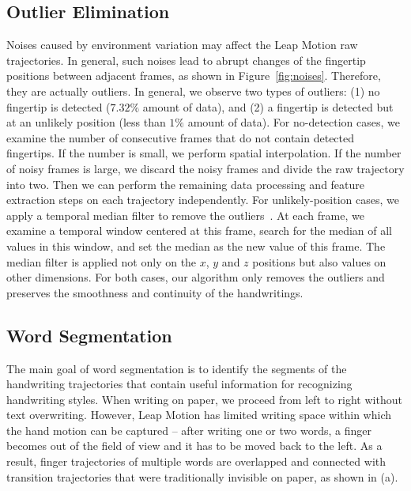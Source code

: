 \subsection{Outlier Elimination}
Noises caused by environment variation may affect the Leap Motion raw trajectories. In general, such noises lead to abrupt changes of the fingertip positions between adjacent frames, as shown in Figure~\ref{fig:noises}. 
Therefore, they are actually outliers. In general, we observe two types of outliers: (1) no fingertip is detected ($7.32\%$ amount of data), and (2) a fingertip is detected but at an unlikely position (less than $1\%$ amount of data). For no-detection cases, we examine the number of consecutive frames that do not contain detected fingertips. If the number is small, we perform spatial interpolation. If the number of noisy frames is large, we discard the noisy frames and divide the raw trajectory into two. 
Then we can perform the remaining data processing and feature extraction steps on each trajectory independently. 
For unlikely-position cases, we apply a temporal median filter to remove the outliers~\cite{SaltNoise}. 
At each frame, we examine a temporal window centered at this frame, search for the median of all values in this window,  and set the median as the new value of this frame. 
The median filter is applied not only on the $x$, $y$ and $z$ positions but also values on other dimensions. For both cases, our algorithm only removes the outliers and preserves the smoothness and continuity of the handwritings. 








 \subsection{Word Segmentation}

The main goal of word segmentation is to identify the segments of the handwriting trajectories that contain useful information for recognizing handwriting styles. 
When writing on paper, we proceed from  left to right %
without text overwriting. %
However, Leap Motion has limited writing space within which the hand motion can be captured -- after writing one or two words, a finger becomes out of the field of view and it has to be moved back to the left.
As a result, finger trajectories of multiple words are overlapped and connected with transition trajectories that were traditionally invisible on paper, as shown in  (a). %

